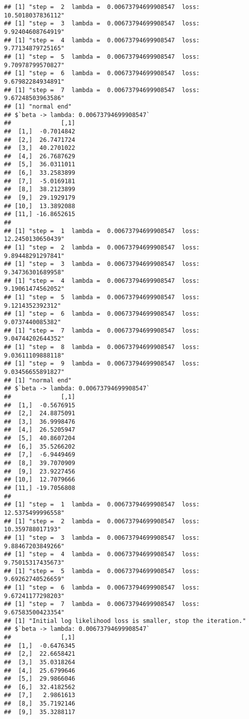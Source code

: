 \documentclass[
]{article}
\begin{document}
\begin{verbatim}
## [1] "step =  2  lambda =  0.00673794699908547  loss:  10.5018037836112"
## [1] "step =  3  lambda =  0.00673794699908547  loss:  9.92404608764919"
## [1] "step =  4  lambda =  0.00673794699908547  loss:  9.77134879725165"
## [1] "step =  5  lambda =  0.00673794699908547  loss:  9.70978799570827"
## [1] "step =  6  lambda =  0.00673794699908547  loss:  9.67982284934891"
## [1] "step =  7  lambda =  0.00673794699908547  loss:  9.67248503963586"
## [1] "normal end"
## $`beta -> lambda: 0.00673794699908547`
##              [,1]
##  [1,]  -0.7014842
##  [2,]  26.7471724
##  [3,]  40.2701022
##  [4,]  26.7687629
##  [5,]  36.0311011
##  [6,]  33.2583899
##  [7,]  -5.0169181
##  [8,]  38.2123899
##  [9,]  29.1929179
## [10,]  13.3892088
## [11,] -16.8652615
## 
## [1] "step =  1  lambda =  0.00673794699908547  loss:  12.2450130650439"
## [1] "step =  2  lambda =  0.00673794699908547  loss:  9.89448291297841"
## [1] "step =  3  lambda =  0.00673794699908547  loss:  9.34736301689958"
## [1] "step =  4  lambda =  0.00673794699908547  loss:  9.19061474562052"
## [1] "step =  5  lambda =  0.00673794699908547  loss:  9.1214352392312"
## [1] "step =  6  lambda =  0.00673794699908547  loss:  9.0737440085382"
## [1] "step =  7  lambda =  0.00673794699908547  loss:  9.04744202644352"
## [1] "step =  8  lambda =  0.00673794699908547  loss:  9.03611109888118"
## [1] "step =  9  lambda =  0.00673794699908547  loss:  9.03456655891827"
## [1] "normal end"
## $`beta -> lambda: 0.00673794699908547`
##              [,1]
##  [1,]  -0.5676915
##  [2,]  24.8875091
##  [3,]  36.9998476
##  [4,]  26.5205947
##  [5,]  40.8607204
##  [6,]  35.5266202
##  [7,]  -6.9449469
##  [8,]  39.7070909
##  [9,]  23.9227456
## [10,]  12.7079666
## [11,] -19.7056808
## 
## [1] "step =  1  lambda =  0.00673794699908547  loss:  12.5375499996558"
## [1] "step =  2  lambda =  0.00673794699908547  loss:  10.359788017193"
## [1] "step =  3  lambda =  0.00673794699908547  loss:  9.88467203849266"
## [1] "step =  4  lambda =  0.00673794699908547  loss:  9.75015317435673"
## [1] "step =  5  lambda =  0.00673794699908547  loss:  9.69262740526659"
## [1] "step =  6  lambda =  0.00673794699908547  loss:  9.67241177298203"
## [1] "step =  7  lambda =  0.00673794699908547  loss:  9.67583500423354"
## [1] "Initial log likelihood loss is smaller, stop the iteration."
## $`beta -> lambda: 0.00673794699908547`
##              [,1]
##  [1,]  -0.6476345
##  [2,]  22.6658421
##  [3,]  35.0318264
##  [4,]  25.6799646
##  [5,]  29.9866046
##  [6,]  32.4182562
##  [7,]   2.9861613
##  [8,]  35.7192146
##  [9,]  35.3288117

\end{verbatim}
\end{document}
